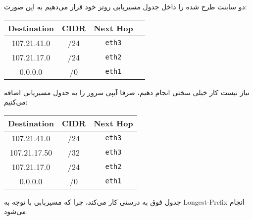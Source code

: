 
دو سابنت طرح شده را داخل جدول مسیریابی روتر خود قرار می‌دهیم به این صورت:

\setLTR
\begin{table}[h]
	\centering
	\begin{tabular}{|c|c|c|c|}
		\hline
		\textbf{Destination} & \textbf{CIDR} & \textbf{Next Hop} \\
		\hline
		107.21.41.0 & /24 & \texttt{eth3}  \\
		107.21.17.0 & /24 & \texttt{eth2}  \\
		0.0.0.0 & /0 & \texttt{eth1}  \\
		\hline
	\end{tabular}
\end{table}
\setRTL


نیاز نیست کار خیلی سختی انجام دهیم، صرفا آیپی سرور را به جدول مسیریابی اضافه می‌کنیم:

\setLTR
\begin{table}[h]
	\centering
	\begin{tabular}{|c|c|c|}
		\hline
		\textbf{Destination} & \textbf{CIDR} & \textbf{Next Hop} \\
		\hline
		107.21.41.0 & /24 & \texttt{eth3}  \\
		107.21.17.50 & /32 & \texttt{eth3}  \\
		107.21.17.0 & /24 & \texttt{eth2}  \\
		0.0.0.0 & /0 & \texttt{eth1}  \\
		\hline
	\end{tabular}
\end{table}
\setRTL

جدول فوق به درستی کار می‌کند، چرا که مسیربابی با توجه به Longest-Prefix انجام می‌شود.
